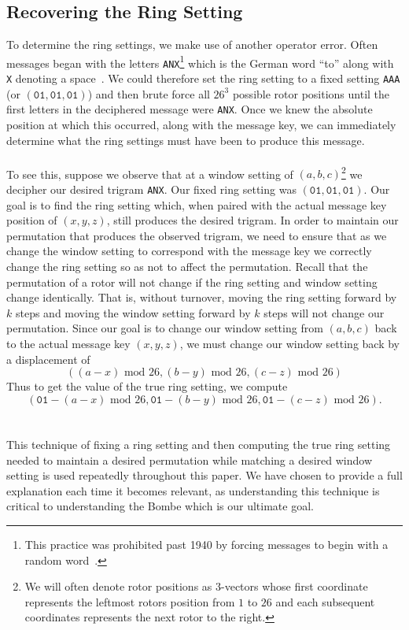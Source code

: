 \subsection{Recovering the Ring Setting}\label{cyclometer_ring_setting}
To determine the ring settings, we make use of another operator
error. Often messages began with the letters
\texttt{ANX}\footnote{This practice was prohibited past 1940 by
forcing messages to begin with a random word~\cite[p.~244]{KozaczukEnigma1984}.} which is
the German word ``to'' along with \texttt{X} denoting a space~\cite[p.~223]{Rejewski1981}. We
could therefore set the ring setting to a fixed setting \texttt{AAA}
(or $(\texttt{01}, \texttt{01}, \texttt{01})$) and then
brute force all $26^3$ possible rotor positions until the first
letters in the deciphered message were \texttt{ANX}. Once we knew the
absolute position at which this occurred, along with the message key,
we can immediately determine what the ring settings must have been to
produce this message.
\\\\To see this, suppose we observe that at a window setting of
$(a,b,c)$\footnote{We will often denote rotor positions as
  $3$-vectors whose first coordinate represents the leftmost rotors
  position from $1$ to $26$ and each subsequent coordinates represents
the next rotor to the right.} we decipher our desired trigram \texttt{ANX}.
Our fixed ring setting was
$(\texttt{01}, \texttt{01}, \texttt{01})$. Our goal is to find the
ring setting which, when paired with the actual message key position
of $(x,y,z)$, still produces the desired trigram. In order to
maintain our permutation that produces the observed trigram, we need
to ensure that as we change the window setting to correspond with the
message key we correctly change the ring setting so as not
to affect the permutation. Recall that the permutation of a rotor
will not change if the ring setting and window setting change
identically. That is, without turnover, moving the ring setting
forward by $k$ steps and moving the window setting forward by $k$
steps will not change our permutation. Since our goal is to change
our window setting from $(a,b,c)$ back to the actual message key
$(x,y,z)$, we must change our window setting back by a displacement of
\[
  ((a-x)\text{ mod } 26, (b-y)\text{ mod }26, (c-z)\text{ mod }26)
\]
Thus to get the value of the true ring setting, we compute
\[
  (\texttt{01} - (a- x)\text{ mod }26, \texttt{01} - (b- y)\text{ mod
    }26, \texttt{01} - (c-
  z)\text{ mod }26).
\]
\\\\This technique of fixing a ring setting and then computing the
true ring setting needed to maintain a desired permutation while
matching a desired window setting is used repeatedly throughout this
paper. We have chosen to provide a full explanation each time it
becomes relevant, as understanding this technique is critical to
understanding the Bombe which is our ultimate goal.
